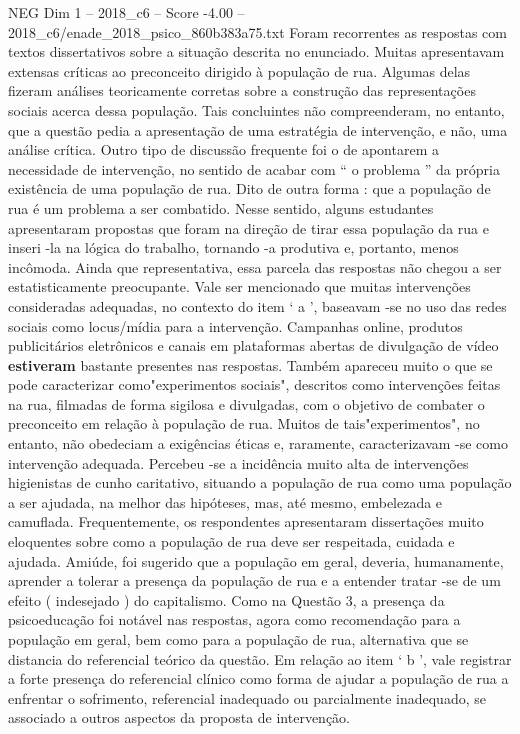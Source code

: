 \begin{textsample}{NEG Dim 1 – 2018\_c6 – Score -4.00 – 2018\_c6/enade\_2018\_psico\_860b383a75.txt}
Foram recorrentes as respostas com textos dissertativos sobre a situação descrita no enunciado.
Muitas apresentavam extensas críticas ao preconceito dirigido à população de rua.
Algumas delas fizeram análises teoricamente corretas sobre a construção das representações sociais acerca dessa população.
Tais concluintes não compreenderam, no entanto, que a questão pedia a apresentação de uma estratégia de intervenção, e não, uma análise crítica.
Outro tipo de discussão frequente foi o de apontarem a necessidade de intervenção, no sentido de acabar com “ o problema ” da própria existência de uma população de rua.
Dito de outra forma : que a população de rua é um problema a ser combatido.
Nesse sentido, alguns estudantes apresentaram propostas que foram na direção de tirar essa população da rua e inseri -la na lógica do trabalho, tornando -a produtiva e, portanto, menos incômoda.
Ainda que representativa, essa parcela das respostas não chegou a ser estatisticamente preocupante.
Vale ser mencionado que muitas intervenções consideradas adequadas, no contexto do item ‘ a ’, baseavam -se no uso das redes sociais como locus/mídia para a intervenção.
Campanhas online, produtos publicitários eletrônicos e canais em plataformas abertas de divulgação de vídeo \textbf{estiveram} bastante presentes nas respostas.
Também apareceu muito o que se pode caracterizar como"experimentos sociais", descritos como intervenções feitas na rua, filmadas de forma sigilosa e divulgadas, com o objetivo de combater o preconceito em relação à população de rua.
Muitos de tais"experimentos", no entanto, não obedeciam a exigências éticas e, raramente, caracterizavam -se como intervenção adequada.
Percebeu -se a incidência muito alta de intervenções higienistas de cunho caritativo, situando a população de rua como uma população a ser ajudada, na melhor das hipóteses, mas, até mesmo, embelezada e camuflada.
Frequentemente, os respondentes apresentaram dissertações muito eloquentes sobre como a população de rua deve ser respeitada, cuidada e ajudada.
Amiúde, foi sugerido que a população em geral, deveria, humanamente, aprender a tolerar a presença da população de rua e a entender tratar -se de um efeito ( indesejado ) do capitalismo.
Como na Questão 3, a presença da psicoeducação foi notável nas respostas, agora como recomendação para a população em geral, bem como para a população de rua, alternativa que se distancia do referencial teórico da questão.
Em relação ao item ‘ b ’, vale registrar a forte presença do referencial clínico como forma de ajudar a população de rua a enfrentar o sofrimento, referencial inadequado ou parcialmente inadequado, se associado a outros aspectos da proposta de intervenção.

\end{textsample}
